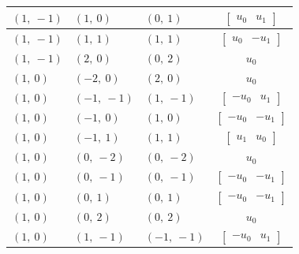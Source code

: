 \documentclass[11pt]{article}
\theoremstyle{definition}
\begin{document}
\begin{longtable}{|l|l|l|c|}
    \hline
    $\left( 1, \  -1\right)$ & $\left( 1, \  0\right)$ & $\left( 0, \  1\right)$ & $\left[\begin{matrix}u_{0} & u_{1}\end{matrix}\right]$ \\
    \hline
    $\left( 1, \  -1\right)$ & $\left( 1, \  1\right)$ & $\left( 1, \  1\right)$ & $\left[\begin{matrix}u_{0} & - u_{1}\end{matrix}\right]$ \\
    \hline
    $\left( 1, \  -1\right)$ & $\left( 2, \  0\right)$ & $\left( 0, \  2\right)$ & $u_{0}$ \\
    \hline
    $\left( 1, \  0\right)$ & $\left( -2, \  0\right)$ & $\left( 2, \  0\right)$ & $u_{0}$ \\
    \hline
    $\left( 1, \  0\right)$ & $\left( -1, \  -1\right)$ & $\left( 1, \  -1\right)$ & $\left[\begin{matrix}- u_{0} & u_{1}\end{matrix}\right]$ \\
    \hline
    $\left( 1, \  0\right)$ & $\left( -1, \  0\right)$ & $\left( 1, \  0\right)$ & $\left[\begin{matrix}- u_{0} & - u_{1}\end{matrix}\right]$ \\
    \hline
    $\left( 1, \  0\right)$ & $\left( -1, \  1\right)$ & $\left( 1, \  1\right)$ & $\left[\begin{matrix}u_{1} & u_{0}\end{matrix}\right]$ \\
    \hline
    $\left( 1, \  0\right)$ & $\left( 0, \  -2\right)$ & $\left( 0, \  -2\right)$ & $u_{0}$ \\
    \hline
    $\left( 1, \  0\right)$ & $\left( 0, \  -1\right)$ & $\left( 0, \  -1\right)$ & $\left[\begin{matrix}- u_{0} & - u_{1}\end{matrix}\right]$ \\
    \hline
    $\left( 1, \  0\right)$ & $\left( 0, \  1\right)$ & $\left( 0, \  1\right)$ & $\left[\begin{matrix}- u_{0} & - u_{1}\end{matrix}\right]$ \\
    \hline
    $\left( 1, \  0\right)$ & $\left( 0, \  2\right)$ & $\left( 0, \  2\right)$ & $u_{0}$ \\
    \hline
    $\left( 1, \  0\right)$ & $\left( 1, \  -1\right)$ & $\left( -1, \  -1\right)$ & $\left[\begin{matrix}- u_{0} & u_{1}\end{matrix}\right]$ \\

\end{longtable}
\end{document}
